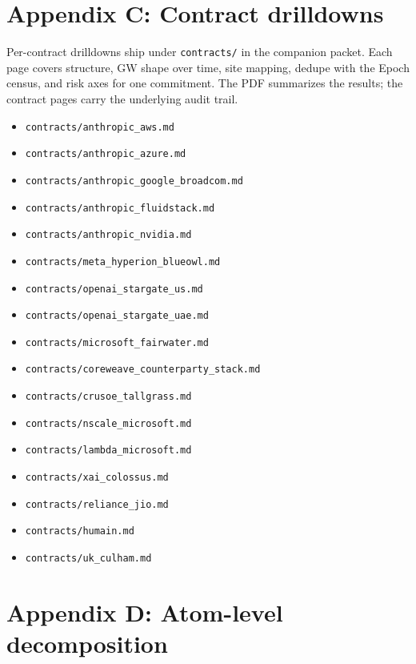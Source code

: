 \documentclass[11pt,a4paper]{article}
\begin{document}
\section*{Appendix C: Contract drilldowns}

\noindent Per-contract drilldowns ship under \texttt{contracts/} in the companion packet. Each page covers structure, GW shape over time, site mapping, dedupe with the Epoch census, and risk axes for one commitment. The PDF summarizes the results; the contract pages carry the underlying audit trail.

\begin{itemize}[leftmargin=1.2em,itemsep=0.1em,topsep=0.3em]
\item \texttt{contracts/anthropic\_aws.md}
\item \texttt{contracts/anthropic\_azure.md}
\item \texttt{contracts/anthropic\_google\_broadcom.md}
\item \texttt{contracts/anthropic\_fluidstack.md}
\item \texttt{contracts/anthropic\_nvidia.md}
\item \texttt{contracts/meta\_hyperion\_blueowl.md}
\item \texttt{contracts/openai\_stargate\_us.md}
\item \texttt{contracts/openai\_stargate\_uae.md}
\item \texttt{contracts/microsoft\_fairwater.md}
\item \texttt{contracts/coreweave\_counterparty\_stack.md}
\item \texttt{contracts/crusoe\_tallgrass.md}
\item \texttt{contracts/nscale\_microsoft.md}
\item \texttt{contracts/lambda\_microsoft.md}
\item \texttt{contracts/xai\_colossus.md}
\item \texttt{contracts/reliance\_jio.md}
\item \texttt{contracts/humain.md}
\item \texttt{contracts/uk\_culham.md}
\end{itemize}


\newpage
\section*{Appendix D: Atom-level decomposition}
\end{document}
